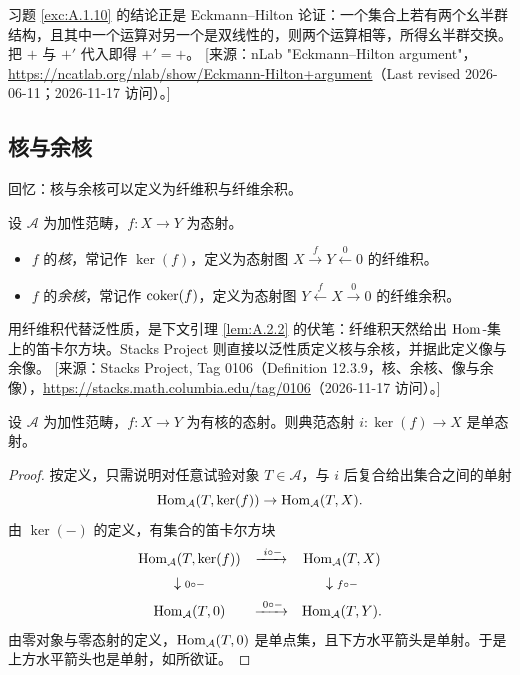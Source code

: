 \begin{yizhu}
习题 \ref{exc:A.1.10} 的结论正是 Eckmann--Hilton 论证：一个集合上若有两个幺半群结构，且其中一个运算对另一个是双线性的，则两个运算相等，所得幺半群交换。把 $+$ 与 $+'$ 代入即得 $+'=+$。
[来源：nLab "Eckmann–Hilton argument"，\url{https://ncatlab.org/nlab/show/Eckmann-Hilton+argument}（Last revised 2026-06-11；2026-11-17 访问）。]
\end{yizhu}

\subsection{核与余核}\label{sec:A.2}

回忆：核与余核可以定义为纤维积与纤维余积。

\begin{definition}\label{def:A.2.1}
设 $\mathcal{A}$ 为加性范畴，$f:X\to Y$ 为态射。
\begin{itemize}[leftmargin=2em,itemsep=0.25ex]
  \item $f$ 的\emph{核}，常记作 $\ker(f)$，定义为态射图 $X\xrightarrow{f}Y\xleftarrow{0}0$ 的纤维积。
  \item $f$ 的\emph{余核}，常记作 $\operatorname{coker}(f)$，定义为态射图 $Y\xleftarrow{f}X\xrightarrow{0}0$ 的纤维余积。
\end{itemize}
\end{definition}

\begin{yizhu}
用纤维积代替泛性质，是下文引理 \ref{lem:A.2.2} 的伏笔：纤维积天然给出 $\operatorname{Hom}$-集上的笛卡尔方块。Stacks Project 则直接以泛性质定义核与余核，并据此定义像与余像。
[来源：Stacks Project, Tag 0106（Definition 12.3.9，核、余核、像与余像），\url{https://stacks.math.columbia.edu/tag/0106}（2026-11-17 访问）。]
\end{yizhu}

\begin{lemma}\label{lem:A.2.2}
设 $\mathcal{A}$ 为加性范畴，$f:X\to Y$ 为有核的态射。则典范态射 $i:\ker(f)\to X$ 是单态射。
\end{lemma}

\begin{proof}
按定义，只需说明对任意试验对象 $T\in\mathcal{A}$，与 $i$ 后复合给出集合之间的单射
\[
\operatorname{Hom}_{\mathcal{A}}(T,\ker(f))\to\operatorname{Hom}_{\mathcal{A}}(T,X).
\]
由 $\ker(-)$ 的定义，有集合的笛卡尔方块
\[
\begin{array}{ccc}
\operatorname{Hom}_{\mathcal{A}}(T,\ker(f)) & \xrightarrow{\ i\circ -} & \operatorname{Hom}_{\mathcal{A}}(T,X)\\[1.2ex]
\downarrow{\scriptstyle 0\circ -} & & \downarrow{\scriptstyle f\circ -}\\[1.2ex]
\operatorname{Hom}_{\mathcal{A}}(T,0) & \xrightarrow{\ 0\circ -} & \operatorname{Hom}_{\mathcal{A}}(T,Y).
\end{array}
\]
由零对象与零态射的定义，$\operatorname{Hom}_{\mathcal{A}}(T,0)$ 是单点集，且下方水平箭头是单射。于是上方水平箭头也是单射，如所欲证。
\end{proof}

